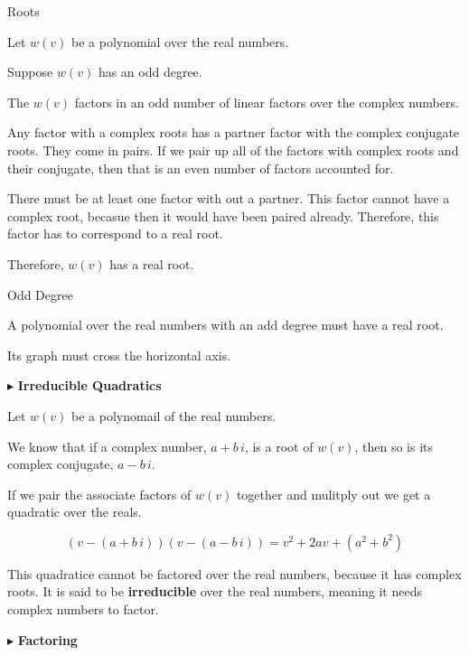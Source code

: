 \documentclass{ximera}
\begin{document}
\begin{example} Roots

Let $w(v)$ be a polynomial over the real numbers.

Suppose $w(v)$ has an odd degree.


The $w(v)$ factors in an odd number of linear factors over the complex numbers.

Any factor with a complex roots has a partner factor with the complex conjugate roots.  They come in pairs.  If we pair up all of the factors with complex roots and their conjugate, then that is an even number of factors accounted for.  

There must be at least one factor with out a partner.  This factor cannot have a complex root, becasue then it would have been paired already.  Therefore, this factor has to correspond to a real root.

Therefore, $w(v)$ has a real root.


\begin{theorem} Odd Degree

A polynomial over the real numbers with an add degree must have a real root.

Its graph must cross the horizontal axis.

\end{theorem}


\end{example}








$\blacktriangleright$  \textbf{Irreducible Quadratics}


Let $w(v)$ be a polynomail of the real numbers.

We know that if a complex number, $a + b \, i$, is a root of $w(v)$, then so is its complex conjugate, $a - b \,i$.

If we pair the associate factors of $w(v)$ together and mulitply out we get a quadratic over the reals.

\[    (v - (a + b \, i)) (v -(a - b \, i))  = v^2 + 2a v + (a^2 + b^2)      \]


This quadratice cannot be factored over the real numbers, because it has complex roots.  It is said to be \textbf{irreducible} over the real numbers, meaning it needs complex numbers to factor.






$\blacktriangleright$  \textbf{Factoring}
\end{document}
